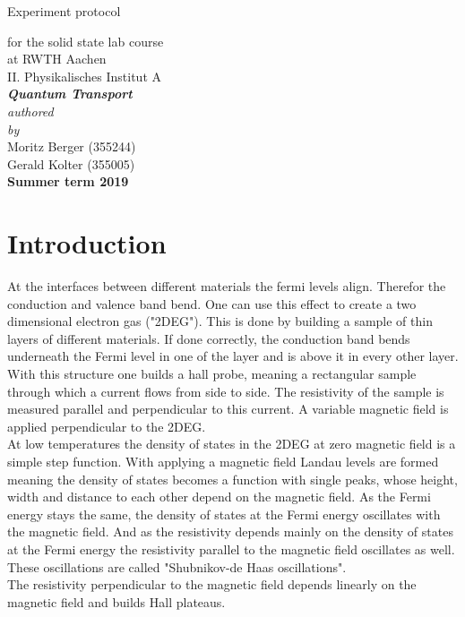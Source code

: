 \documentclass[12pt,a4paper]{article}
\author{Gerald}
\begin{document}
	\setlength{\parindent}{0pt} 
	\begin{center}
		{\LARGE Experiment protocol}\\
		\begin{large}
			for the solid state lab course\\[0.4cm]
			at RWTH Aachen\\
			II. Physikalisches Institut A\\[5.5cm]
			\Large\textbf{\textsl{Quantum Transport}}\\[5.5cm]
			\normalsize\textit{authored\\by}\\[0.4cm]
			\large{Moritz Berger (355244)\\Gerald Kolter (355005)}\\[2cm]
			\large \textbf{Summer term 2019}
		\end{large}
	\end{center}
	\newpage
	
	\tableofcontents
	\newpage

\section{Introduction}
At the interfaces between different materials the fermi levels align. Therefor the conduction and valence band bend. One can use this effect to create a two dimensional electron gas ("2DEG"). This is done by building a sample of thin layers of different materials. If done correctly, the conduction band bends underneath the Fermi level in one of the layer and is above it in every other layer. \\
With this structure one builds a hall probe, meaning a rectangular sample through which a current flows from side to side. The resistivity of the sample is measured parallel and perpendicular to this current. A variable magnetic field is applied perpendicular to the 2DEG. \\
At low temperatures the density of states in the 2DEG at zero magnetic field is a simple step function. With applying a magnetic field Landau levels are formed meaning the density of states becomes a function with single peaks, whose height, width and distance to each other depend on the magnetic field. As the Fermi energy stays the same, the density of states at the Fermi energy oscillates with the magnetic field. And as the resistivity depends mainly on the density of states at the Fermi energy the resistivity parallel to the magnetic field oscillates as well. These oscillations are called "Shubnikov-de Haas oscillations". \\
The resistivity perpendicular to the magnetic field depends linearly on the magnetic field and builds Hall plateaus.
\end{document}
